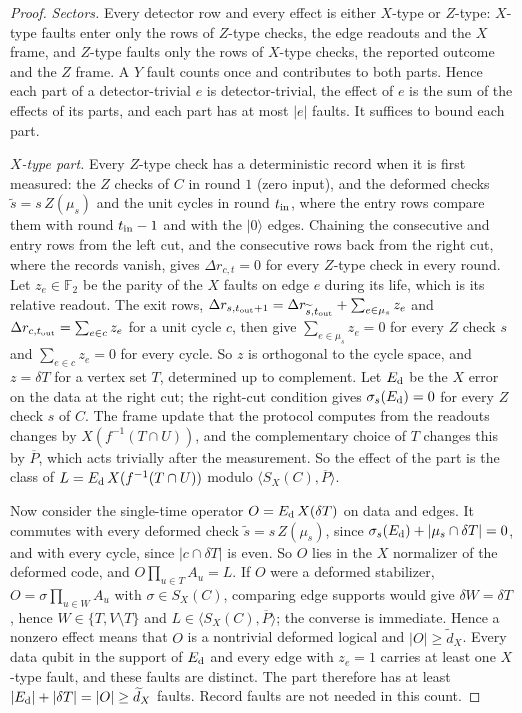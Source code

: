 \documentclass[aps,prx,reprint,superscriptaddress,nofootinbib,floatfix,longbibliography]{revtex4-2}
\theoremstyle{definition}
\begin{document}
\begin{proof}
\emph{Sectors.}  Every detector row and every effect is either $X$-type or
$Z$-type: $X$-type faults enter only the rows of $Z$-type checks, the edge
readouts and the $X$ frame, and $Z$-type faults only the rows of $X$-type
checks, the reported outcome and the $Z$ frame.  A $Y$ fault counts once and
contributes to both parts.  Hence each part of a detector-trivial $e$ is
detector-trivial, the effect of $e$ is the sum of the effects of its parts,
and each part has at most $|e|$ faults.  It suffices to bound each part.

\emph{$X$-type part.}  Every $Z$-type check has a deterministic record when it
is first measured: the $Z$ checks of $C$ in round $1$ (zero input), and the
deformed checks $\widetilde s=s\,Z(\mu_s)$ and the unit cycles in round
$t_{\rm in}$, where the entry rows compare them with round $t_{\rm in}-1$ and
with the $|0\rangle$ edges.  Chaining the consecutive and entry rows from the
left cut, and the consecutive rows back from the right cut, where the records
vanish, gives $\Delta r_{c,t}=0$ for every $Z$-type check in every round.
Let $z_e\in\mathbb F_2$ be the parity of the $X$ faults on edge $e$ during its
life, which is its relative readout.  The exit rows,
$\Delta r_{s,t_{\rm out}+1}=\Delta r_{\widetilde s,t_{\rm out}}
+\sum_{e\in\mu_s}z_e$ and $\Delta r_{c,t_{\rm out}}=\sum_{e\in c}z_e$ for a
unit cycle $c$, then give $\sum_{e\in\mu_s}z_e=0$ for every $Z$ check $s$ and
$\sum_{e\in c}z_e=0$ for every cycle.  So $z$ is orthogonal to the cycle
space, and $z=\delta T$ for a vertex set $T$, determined up to complement.
Let $E_{\rm d}$ be the $X$ error on the data at the right cut; the right-cut
condition gives $\sigma_s(E_{\rm d})=0$ for every $Z$ check $s$ of $C$.  The
frame update that the protocol computes from the readouts changes by
$X(f^{-1}(T\cap U))$, and the complementary choice of $T$ changes this by
$\overline P$, which acts trivially after the measurement.  So the effect of
the part is the class of $L=E_{\rm d}\,X(f^{-1}(T\cap U))$ modulo
$\langle S_X(C),\overline P\rangle$.

Now consider the single-time operator $O=E_{\rm d}\,X(\delta T)$ on data and
edges.  It commutes with every deformed check
$\widetilde s=s\,Z(\mu_s)$, since $\sigma_s(E_{\rm d})+|\mu_s\cap\delta T|=0$,
and with every cycle, since $|c\cap\delta T|$ is even.  So $O$ lies in the $X$
normalizer of the deformed code, and $O\prod_{u\in T}A_u=L$.  If $O$ were a
deformed stabilizer, $O=\sigma\prod_{u\in W}A_u$ with $\sigma\in S_X(C)$,
comparing edge supports would give $\delta W=\delta T$, hence $W\in\{T,V\setminus
T\}$ and $L\in\langle S_X(C),\overline P\rangle$; the converse is immediate.
Hence a nonzero effect means that $O$ is a nontrivial deformed logical and
$|O|\geq\widetilde d_X$.  Every data qubit in the support of $E_{\rm d}$ and
every edge with $z_e=1$ carries at least one $X$-type fault, and these faults
are distinct.  The part therefore has at least
$|E_{\rm d}|+|\delta T|=|O|\geq\widetilde d_X$ faults.  Record faults are not
needed in this count.


\end{proof}
\end{document}

